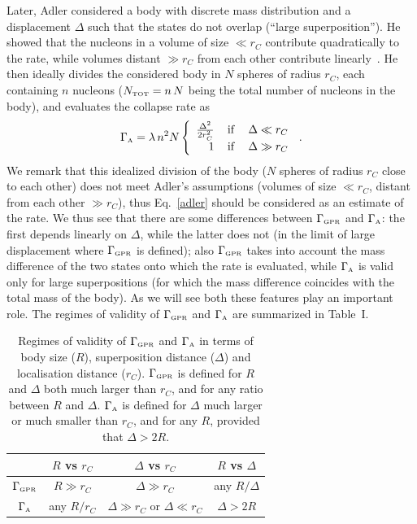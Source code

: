 \documentclass[11pt,onecolumn,amssymb,nofootinbib]{revtex4}
\newcommand\beq{\begin{equation}}
\newcommand\eeq{\end{equation}}
\begin{document}
Later, Adler considered a body with discrete mass distribution and a displacement $\Delta$ such that the states do not overlap (``large superposition'').
He showed that the nucleons in a volume of size $\ll r_C$ contribute quadratically to the rate, while volumes distant $\gg r_C$ from each other contribute linearly~\cite{Adl07}. He then ideally divides the considered body in $N$ spheres of radius $r_C$, each containing $n$ nucleons ($N_{\text{\tiny{TOT}}}=n\,N$ being the total number of nucleons in the body), and evaluates the collapse rate as
\beq\label{adler}
\Gamma_{\text{\tiny{A}}}= \lambda\, n^2N\left\{
\begin{array}{rcl}
\frac{\Delta^2}{2r_C^2}&\,\mathrm{if}\,&\Delta\ll r_C \\
1&\,\mathrm{if}\,&\Delta\gg r_C
\end{array}\right.\,.
\eeq
We remark that this idealized division of the body ($N$ spheres of radius $r_C$ close to each other) does not meet Adler's assumptions (volumes of size $\ll r_C$, distant from each other $\gg r_C$), thus Eq.~\eqref{adler} should be considered as an estimate of the rate. %
We thus see that there are some differences between $\Gamma_{\text{\tiny{GPR}}}$ and $\Gamma_{\text{\tiny{A}}}$: the first depends linearly on $\Delta$, while the latter does not (in the limit of large displacement where $\Gamma_{\text{\tiny{GPR}}}$ is defined); also $\Gamma_{\text{\tiny{GPR}}}$ takes into account the mass difference of the two states onto which the rate is evaluated, while $\Gamma_{\text{\tiny{A}}}$ is valid only for large superpositions (for which the mass difference coincides with the total mass of the body). As we will see both these features play an important role. The regimes of validity of $\Gamma_{\text{\tiny{GPR}}}$ and $\Gamma_{\text{\tiny{A}}}$ are summarized in Table~I.
\begin{table}\label{table}
\begin{center}
  \begin{tabular}{c|c|c|c|}
  &$R$ vs $r_C$&$\Delta$ vs $r_C$& $R$ vs $\Delta$\\
  \hline
$\Gamma_{\text{\tiny{GPR}}}$&$R\gg r_C$& $ \Delta\gg r_C$& any $R/\Delta$\\
\hline
$\Gamma_{\text{\tiny{A}}}$&any $R/r_C$ &  $\Delta\gg r_C$ or $\Delta\ll r_C$&$\Delta>2R$\\
\hline
\end{tabular}
\end{center}
 \caption{Regimes of validity of $\Gamma_{\text{\tiny{GPR}}}$ and $\Gamma_{\text{\tiny{A}}}$ in terms of body size ($R$), superposition distance ($\Delta$) and localisation distance ($r_C$). $\Gamma_{\text{\tiny{GPR}}}$ is defined for $R$ and $\Delta$ both much larger than $r_C$, and for any ratio between $R$ and $\Delta$. $\Gamma_{\text{\tiny{A}}}$ is defined for $\Delta$ much larger or much smaller than $r_C$, and for any $R$, provided that $\Delta>2R$. %
 }
\end{table}
\end{document}
